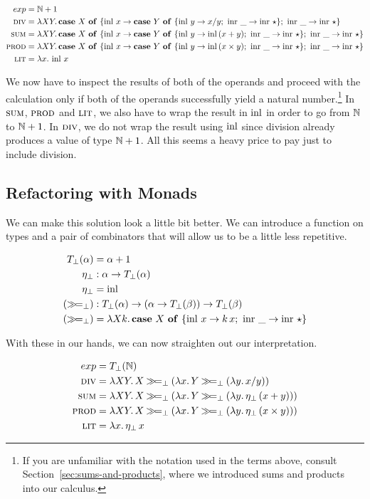 \begin{align*}
  exp &= \mathbb{N} + 1 \\
  \textsc{div} &= \lambda X Y.\, \text{\textbf{case} $X$ \textbf{of} $\{ \operatorname{inl}\,x \to \text{\textbf{case} $Y$ \textbf{of} $\{ \operatorname{inl}\,y \to x / y;\ \operatorname{inr}\,\_ \to \operatorname{inr}\,\star \}$};\ \operatorname{inr}\,\_ \to \operatorname{inr}\,\star \}$} \\ 
  \textsc{sum} &= \lambda X Y.\, \text{\textbf{case} $X$ \textbf{of} $\{ \operatorname{inl}\,x \to \text{\textbf{case} $Y$ \textbf{of} $\{ \operatorname{inl}\,y \to \operatorname{inl}\,(x + y);\ \operatorname{inr}\,\_ \to \operatorname{inr}\,\star \}$};\ \operatorname{inr}\,\_ \to \operatorname{inr}\,\star \}$} \\ 
  \textsc{prod} &= \lambda X Y.\, \text{\textbf{case} $X$ \textbf{of} $\{ \operatorname{inl}\,x \to \text{\textbf{case} $Y$ \textbf{of} $\{ \operatorname{inl}\,y \to \operatorname{inl}\,(x \times y);\ \operatorname{inr}\,\_ \to \operatorname{inr}\,\star \}$};\ \operatorname{inr}\,\_ \to \operatorname{inr}\,\star \}$} \\ 
  \textsc{lit} &= \lambda x.\, \operatorname{inl}\,x
\end{align*}

We now have to inspect the results of both of the operands and proceed with
the calculation only if both of the operands successfully yield a natural
number.\footnote{If you are unfamiliar with the notation used in the terms
  above, consult Section~\ref{sec:sums-and-products}, where we introduced
  sums and products into our calculus.} In $\textsc{sum}$, $\textsc{prod}$ and $\textsc{lit}$,
we also have to wrap the result in $\operatorname{inl}$ in order to go from $\mathbb{N}$ to
$\mathbb{N} + 1$. In $\textsc{div}$, we do not wrap the result using $\operatorname{inl}$ since
division already produces a value of type $\mathbb{N} + 1$. All this seems a heavy
price to pay just to include division.


\subsection{Refactoring with Monads}
\label{ssec:refactoring-with-monads}

We can make this solution look a little bit better. We can introduce a
function on types and a pair of combinators that will allow us to be a
little less repetitive.

\begin{align*}
  T_\bot(\alpha) &= \alpha + 1 \\
  \eta_\bot &: \alpha \to T_\bot(\alpha) \\
  \eta_\bot &= \operatorname{inl} \\
  (\mathbin{\gg\!=}_\bot) &: T_\bot(\alpha) \to (\alpha \to T_\bot(\beta)) \to T_\bot(\beta) \\
  (\mathbin{\gg\!=}_\bot) &= \lambda X k.\, \text{\textbf{case} $X$ \textbf{of} $\{ \operatorname{inl}\,x \to k\,x;\ \operatorname{inr}\,\_ \to \operatorname{inr}\,\star \}$}
\end{align*}

With these in our hands, we can now straighten out our interpretation.

\begin{align*}
  exp &= T_\bot(\mathbb{N}) \\
  \textsc{div} &= \lambda X Y.\, X \mathbin{\gg\!=}_\bot (\lambda x.\, Y \mathbin{\gg\!=}_\bot (\lambda y.\, x / y)) \\
  \textsc{sum} &= \lambda X Y.\, X \mathbin{\gg\!=}_\bot (\lambda x.\, Y \mathbin{\gg\!=}_\bot (\lambda y.\, \eta_\bot\,(x + y))) \\
  \textsc{prod} &= \lambda X Y.\, X \mathbin{\gg\!=}_\bot (\lambda x.\, Y \mathbin{\gg\!=}_\bot (\lambda y.\, \eta_\bot\,(x \times y))) \\
  \textsc{lit} &= \lambda x.\, \eta_\bot\,x
\end{align*}

